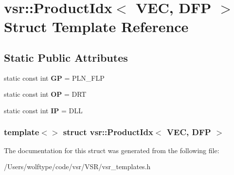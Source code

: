 \hypertarget{structvsr_1_1_product_idx_3_01_v_e_c_00_01_d_f_p_01_4}{\section{vsr\-:\-:Product\-Idx$<$ V\-E\-C, D\-F\-P $>$ Struct Template Reference}
\label{structvsr_1_1_product_idx_3_01_v_e_c_00_01_d_f_p_01_4}
}
\subsection*{Static Public Attributes}
\begin{DoxyCompactItemize}
\item 
\hypertarget{structvsr_1_1_product_idx_3_01_v_e_c_00_01_d_f_p_01_4_a8b8a89b11ca7ea30a60fdf77bdc9c8d4}{static const int {\bfseries G\-P} = P\-L\-N\-\_\-\-F\-L\-P}\label{structvsr_1_1_product_idx_3_01_v_e_c_00_01_d_f_p_01_4_a8b8a89b11ca7ea30a60fdf77bdc9c8d4}

\item 
\hypertarget{structvsr_1_1_product_idx_3_01_v_e_c_00_01_d_f_p_01_4_a11807c4ea156b5d8bf4a8effa74599f2}{static const int {\bfseries O\-P} = D\-R\-T}\label{structvsr_1_1_product_idx_3_01_v_e_c_00_01_d_f_p_01_4_a11807c4ea156b5d8bf4a8effa74599f2}

\item 
\hypertarget{structvsr_1_1_product_idx_3_01_v_e_c_00_01_d_f_p_01_4_a53b4dc914cc6e3a29026474e7ac699a9}{static const int {\bfseries I\-P} = D\-L\-L}\label{structvsr_1_1_product_idx_3_01_v_e_c_00_01_d_f_p_01_4_a53b4dc914cc6e3a29026474e7ac699a9}

\end{DoxyCompactItemize}
\subsubsection*{template$<$$>$ struct vsr\-::\-Product\-Idx$<$ V\-E\-C, D\-F\-P $>$}



The documentation for this struct was generated from the following file\-:\begin{DoxyCompactItemize}
\item 
/\-Users/wolftype/code/vsr/\-V\-S\-R/vsr\-\_\-templates.\-h\end{DoxyCompactItemize}

